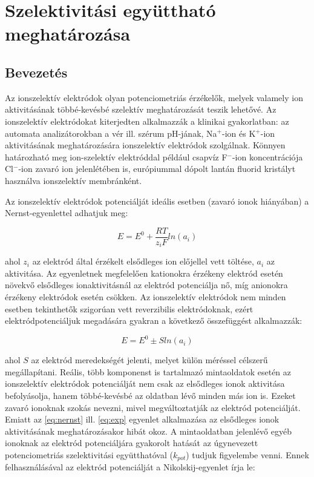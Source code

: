 \section{Szelektivitási együttható meghatározása}
\subsection{Bevezetés}

Az ionszelektív elektródok olyan potenciometriás érzékelők, melyek valamely ion aktivitásának többé-kevésbé szelektív meghatározását teszik lehetővé.
Az ionszelektív elektródokat kiterjedten alkalmazzák a klinikai gyakorlatban: az automata analizátorokban a vér ill. szérum pH-jának, Na$^+$-ion és K$^+$-ion aktivitásának meghatározására ionszelektív elektródok szolgálnak. Könnyen határozható meg ion-szelektív elektróddal például csapvíz F$^-$-ion koncentrációja Cl$^-$-ion zavaró ion jelenlétében is, európiummal dópolt lantán fluorid kristályt használva ionszelektív membránként.

Az ionszelektív elektródok potenciálját ideális esetben (zavaró ionok hiányában) a Nernst-egyenlettel adhatjuk meg:

\begin{equation}
\label{eq:nernst}
	E
	=
	E^0
	+\frac{RT}{z_i F}
	ln(a_i)
\end{equation}

ahol $z_i$ az elektród által érzékelt elsődleges ion előjellel vett töltése, $a_i$ az aktivitása.
Az egyenletnek megfelelően kationokra érzékeny elektród esetén növekvő elsődleges ionaktivitásnál az elektród potenciálja nő, míg anionokra érzékeny elektródok esetén csökken.
Az ionszelektív elektródok nem minden esetben tekinthetők szigorúan vett reverzibilis elektródoknak, ezért elektródpotenciáljuk megadására gyakran a következő összefüggést alkalmazzák:

\begin{equation}
\label{eq:exp}
	E
	=
	E^0
	\pm S ln(a_i)
\end{equation}

ahol $S$ az elektród meredekségét jelenti, melyet külön méréssel célszerű megállapítani.
Reális, több komponenst is tartalmazó mintaoldatok esetén az ionszelektív elektródok potenciálját nem csak az elsődleges ionok aktivitása befolyásolja, hanem többé-kevésbé az oldatban lévő minden más ion is.
Ezeket zavaró ionoknak szokás nevezni, mivel megváltoztatják az elektród potenciálját.
Emiatt az \ref{eq:nernst} ill. \ref{eq:exp} egyenlet alkalmazása az elsődleges ionok aktivitásának meghatározásakor hibát okoz.
A mintaoldatban jelenlévő egyéb ionoknak az elektród potenciáljára gyakorolt hatását az úgynevezett potenciometriás szelektivitási együtthatóval ($k_{pot}$) tudjuk figyelembe venni.
Ennek felhasználásával az elektród potenciálját a Nikolskij-egyenlet írja le:

